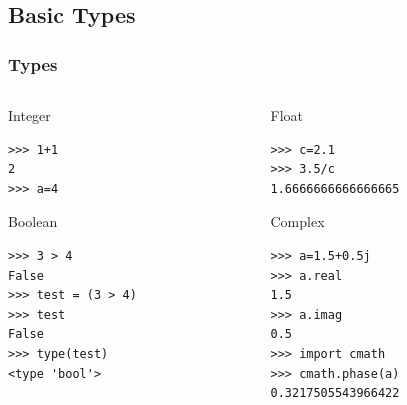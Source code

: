 \documentclass[colorlinks]{beamer}
\begin{document}
\subsection{Basic Types}
\begin{frame}[fragile]\frametitle{Types}
 \begin{columns}[T]
\begin{column}{.5\textwidth}
   \begin{block}{Integer}
\tiny
\begin{verbatim}
>>> 1+1
2
>>> a=4
\end{verbatim}

  \end{block}
 \begin{block}{Boolean}
\tiny
\tiny
\begin{verbatim}
>>> 3 > 4
False
>>> test = (3 > 4)
>>> test
False
>>> type(test)
<type 'bool'>
\end{verbatim}

\end{block}
\end{column}
    \begin{column}{.5\textwidth}
 \begin{block}{Float}
\tiny
\begin{verbatim}
>>> c=2.1
>>> 3.5/c
1.6666666666666665
\end{verbatim}


\end{block}
  \begin{block}{Complex}
\tiny
\begin{verbatim}
>>> a=1.5+0.5j
>>> a.real
1.5
>>> a.imag
0.5
>>> import cmath
>>> cmath.phase(a)
0.3217505543966422
\end{verbatim}

  \end{block}

\end{column}
\end{columns}
\end{frame}
\end{document}
